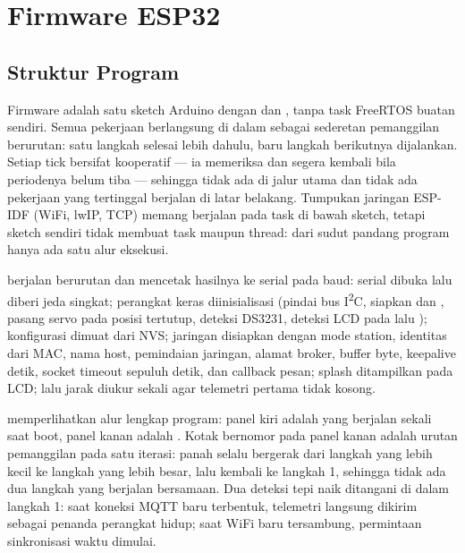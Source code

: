 \chapter{Firmware ESP32}
\label{ch:04-firmware}

\section{Struktur Program}

Firmware adalah satu sketch Arduino dengan  dan , tanpa
task FreeRTOS buatan sendiri. Semua pekerjaan berlangsung di dalam 
sebagai sederetan pemanggilan berurutan: satu langkah selesai lebih dahulu, baru
langkah berikutnya dijalankan. Setiap tick bersifat kooperatif --- ia memeriksa
 dan segera kembali bila periodenya belum tiba --- sehingga tidak ada
 di jalur utama dan tidak ada pekerjaan yang tertinggal berjalan di
latar belakang. Tumpukan jaringan ESP-IDF (WiFi, lwIP, TCP) memang berjalan pada task
di bawah sketch, tetapi sketch sendiri tidak membuat task maupun thread: dari sudut
pandang program hanya ada satu alur eksekusi.

 berjalan berurutan dan mencetak hasilnya ke serial pada
\SerialBaud{} baud: serial dibuka lalu diberi jeda singkat; perangkat keras
diinisialisasi (pindai bus I\textsuperscript{2}C, siapkan  dan
, pasang servo pada posisi tertutup, deteksi DS3231, deteksi LCD pada
\AddrLcd{} lalu \AddrLcdAlt); konfigurasi dimuat dari NVS; jaringan disiapkan
dengan mode station, identitas dari MAC, nama host, pemindaian jaringan, alamat
broker, buffer \MqttBuffer{} byte, keepalive \KeepAliveS{} detik, socket timeout
sepuluh detik, dan callback pesan; splash ditampilkan pada LCD; lalu jarak diukur
sekali agar telemetri pertama tidak kosong.

 memperlihatkan alur lengkap program: panel kiri adalah
 yang berjalan sekali saat boot, panel kanan adalah . Kotak
bernomor pada panel kanan adalah urutan pemanggilan pada satu iterasi: panah selalu
bergerak dari langkah yang lebih kecil ke langkah yang lebih besar, lalu kembali ke
langkah 1, sehingga tidak ada dua langkah yang berjalan bersamaan. Dua deteksi tepi
naik ditangani di dalam langkah 1: saat koneksi MQTT baru terbentuk, telemetri langsung
dikirim sebagai penanda perangkat hidup; saat WiFi baru tersambung, permintaan
sinkronisasi waktu dimulai.



